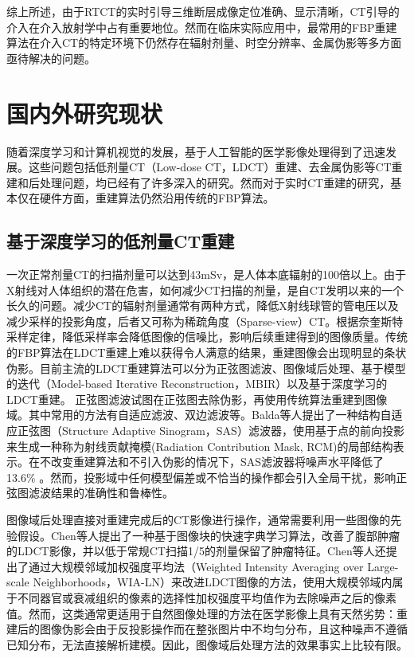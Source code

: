综上所述，由于RTCT的实时引导三维断层成像定位准确、显示清晰，CT引导的介入在介入放射学中占有重要地位。然而在临床实际应用中，最常用的FBP重建算法在介入CT的特定环境下仍然存在辐射剂量、时空分辨率、金属伪影等多方面亟待解决的问题。


\section{国内外研究现状}
随着深度学习和计算机视觉的发展，基于人工智能的医学影像处理得到了迅速发展。这些问题包括低剂量CT（Low-dose CT，LDCT）重建、去金属伪影等CT重建和后处理问题，均已经有了许多深入的研究。然而对于实时CT重建的研究，基本仅在硬件方面，重建算法仍然沿用传统的FBP算法。

\subsection{基于深度学习的低剂量CT重建}
一次正常剂量CT的扫描剂量可以达到43mSv，是人体本底辐射的100倍以上\cite{smith-bindmanRadiationDoseAssociated2009}。由于X射线对人体组织的潜在危害，如何减少CT扫描的剂量，是自CT发明以来的一个长久的问题。减少CT的辐射剂量通常有两种方式，降低X射线球管的管电压以及减少采样的投影角度，后者又可称为稀疏角度（Sparse-view）CT。根据奈奎斯特采样定律，降低采样率会降低图像的信噪比，影响后续重建得到的图像质量。传统的FBP算法在LDCT重建上难以获得令人满意的结果，重建图像会出现明显的条状伪影。目前主流的LDCT重建算法可以分为正弦图滤波、图像域后处理、基于模型的迭代（Model-based Iterative Reconstruction，MBIR）以及基于深度学习的LDCT重建。
正弦图滤波试图在正弦图去除伪影，再使用传统算法重建到图像域。其中常用的方法有自适应滤波、双边滤波等。Balda等人提出了一种结构自适应正弦图（Structure Adaptive Sinogram，SAS）滤波器，使用基于点的前向投影来生成一种称为射线贡献掩模(Radiation Contribution Mask, RCM)的局部结构表示。在不改变重建算法和不引入伪影的情况下，SAS滤波器将噪声水平降低了13.6\% \cite{baldaRayContributionMasks2012}。然而，投影域中任何模型偏差或不恰当的操作都会引入全局干扰，影响正弦图滤波结果的准确性和鲁棒性。

图像域后处理直接对重建完成后的CT影像进行操作，通常需要利用一些图像的先验假设。Chen等人提出了一种基于图像块的快速字典学习算法，改善了腹部肿瘤的LDCT影像，并以低于常规CT扫描1/5的剂量保留了肿瘤特征\cite{chenImprovingAbdomenTumor2013}。Chen等人还提出了通过大规模邻域加权强度平均法（Weighted Intensity Averaging over Large-scale Neighborhoods，WIA-LN）来改进LDCT图像的方法，使用大规模邻域内属于不同器官或衰减组织的像素的选择性加权强度平均值作为去除噪声之后的像素值\cite{chenImprovingLowdoseXray2010}。然而，这类通常更适用于自然图像处理的方法在医学影像上具有天然劣势：重建后的图像伪影会由于反投影操作而在整张图片中不均匀分布，且这种噪声不遵循已知分布，无法直接解析建模。因此，图像域后处理方法的效果事实上比较有限。

